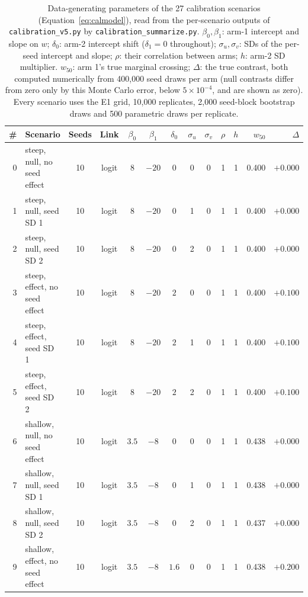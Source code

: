 \begin{table}[H]
\caption{Data-generating parameters of the 27 calibration scenarios (Equation~\ref{eq:calmodel}), read from the per-scenario outputs of \texttt{calibration\_v5.py} by \texttt{calibration\_summarize.py}. $\beta_0,\beta_1$: arm-1 intercept and slope on $w$; $\delta_0$: arm-2 intercept shift ($\delta_1=0$ throughout); $\sigma_u,\sigma_v$: SDs of the per-seed intercept and slope; $\rho$: their correlation between arms; $h$: arm-2 SD multiplier. $w_{50}$: arm 1's true marginal crossing; $\Delta$: the true contrast, both computed numerically from 400,000 seed draws per arm (null contrasts differ from zero only by this Monte Carlo error, below $5\times10^{-4}$, and are shown as zero). Every scenario uses the E1 grid, 10,000 replicates, 2,000 seed-block bootstrap draws and 500 parametric draws per replicate.}
\label{tab:calscen}
\centering\scriptsize\setlength{\tabcolsep}{3pt}
\begin{tabular}{@{}rlcccccccccrr@{}}
\toprule
\# & Scenario & Seeds & Link & $\beta_0$ & $\beta_1$ & $\delta_0$ & $\sigma_u$ & $\sigma_v$ & $\rho$ & $h$ & $w_{50}$ & $\Delta$ \\
\midrule
0 & steep, null, no seed effect & 10 & logit & $8$ & $-20$ & $0$ & 0 & 0 & 1 & 1 & 0.400 & $+0.000$ \\
1 & steep, null, seed SD 1 & 10 & logit & $8$ & $-20$ & $0$ & 1 & 0 & 1 & 1 & 0.400 & $+0.000$ \\
2 & steep, null, seed SD 2 & 10 & logit & $8$ & $-20$ & $0$ & 2 & 0 & 1 & 1 & 0.400 & $+0.000$ \\
3 & steep, effect, no seed effect & 10 & logit & $8$ & $-20$ & $2$ & 0 & 0 & 1 & 1 & 0.400 & $+0.100$ \\
4 & steep, effect, seed SD 1 & 10 & logit & $8$ & $-20$ & $2$ & 1 & 0 & 1 & 1 & 0.400 & $+0.100$ \\
5 & steep, effect, seed SD 2 & 10 & logit & $8$ & $-20$ & $2$ & 2 & 0 & 1 & 1 & 0.400 & $+0.100$ \\
6 & shallow, null, no seed effect & 10 & logit & $3.5$ & $-8$ & $0$ & 0 & 0 & 1 & 1 & 0.438 & $+0.000$ \\
7 & shallow, null, seed SD 1 & 10 & logit & $3.5$ & $-8$ & $0$ & 1 & 0 & 1 & 1 & 0.438 & $+0.000$ \\
8 & shallow, null, seed SD 2 & 10 & logit & $3.5$ & $-8$ & $0$ & 2 & 0 & 1 & 1 & 0.437 & $+0.000$ \\
9 & shallow, effect, no seed effect & 10 & logit & $3.5$ & $-8$ & $1.6$ & 0 & 0 & 1 & 1 & 0.438 & $+0.200$ \\

\end{tabular}
\end{table}
